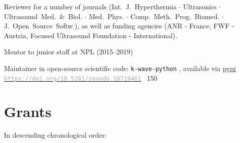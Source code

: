 \documentclass[11pt, a4paper]{awesome-cv}
\begin{document}
\begin{cventries}
{\begin{cvitems}
\item Reviewer for a number of journals (Int.~J.~Hyperthermia $\cdot$ Ultrasonics $\cdot$ Ultrasound~Med.~\&~Biol. $\cdot$ Med.~Phys. $\cdot$ Comp.~Meth.~Prog.~Biomed. $\cdot$ J.~Open~Source~Softw.), as well as funding agencies (ANR - France, FWF - Austria, Focused Ultrasound Foundation - International).
\item Mentor to junior staff at NPL (2015--2019)
\item Maintainer in open-source scientific code: \texttt{k-wave-python} \href{https://github.com/waltsims/k-wave-python}{}, available via \href{https://pypi.org/project/k-Wave-python/}{pypi} \newline{}%
\href{https://doi.org/10.5281/zenodo.10719461}{\textcolor{darkgray}{\texttt{https://doi.org/10.5281/zenodo.10719461}}} \hspace*{2cm} \faStarO ~150
\end{cvitems}}

%
%
\end{cventries}

\hypertarget{grants}{\section{Grants}\label{grants}}

In descending chronological order:
\end{document}
